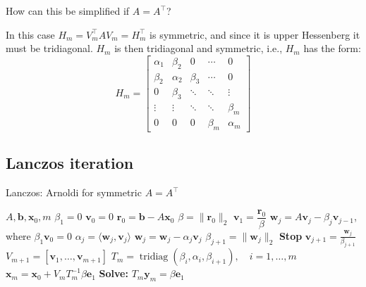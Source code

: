 How can this be simplified if $A = A^\top$?

In this case $H_m = V_m^\top A V_m = H_m^\top$ is symmetric, and since it is upper Hessenberg it must be tridiagonal.
$H_m$ is then tridiagonal and symmetric, i.e., $H_m$ has the form:
\[
    H_m =
    \begin{bmatrix}
        \alpha_1 & \beta_2  & 0       & \cdots  & 0        \\
        \beta_2  & \alpha_2 & \beta_3 & \cdots  & 0        \\
        0        & \beta_3  & \ddots  & \ddots  & \vdots   \\
        \vdots   & \vdots   & \ddots  & \ddots  & \beta_m  \\
        0        & 0        & 0       & \beta_m & \alpha_m
    \end{bmatrix}
\]

\subsection{Lanczos iteration}
\begin{algorithm}[H]
    \caption{Lanczos: Arnoldi for symmetric $A=A^\top$}
    \begin{algorithmic}[0]
        \Require $A, \mathbf{b}, \mathbf{x}_0, m$
        \State $\beta_1 = 0$
        \State $\mathbf{v}_0 = 0$
        \State $\mathbf{r}_0 = \mathbf{b} - A\mathbf{x}_0$
        \State $\beta = \|\mathbf{r}_0\|_2$
        \State $\mathbf{v}_1 = \dfrac{\mathbf{r}_0}{\beta}$
        \State $\mathbf{w}_j = A\mathbf{v}_j - \beta_j \mathbf{v}_{j-1}$, where $\beta_1 \mathbf{v}_0 = 0$
        \State $\alpha_j = \langle \mathbf{w}_j, \mathbf{v}_j \rangle$
        \State $\mathbf{w}_j = \mathbf{w}_j - \alpha_j \mathbf{v}_j$
        \State $\beta_{j+1} = \|\mathbf{w}_j\|_2$
         \textbf{Stop}
        \EndIf
        \State $\mathbf{v}_{j+1} = \frac{\mathbf{w}_j}{\beta_{j+1}}$
        \EndFor
        \Return $V_{m+1} = [\mathbf{v}_1, \ldots, \mathbf{v}_{m+1}]$
        \State $T_m = \operatorname{tridiag}(\beta_i, \alpha_i, \beta_{i+1}), \quad i=1,\ldots,m$
        \State $\mathbf{x}_m = \mathbf{x}_0 + V_m T_m^{-1} \beta \mathbf{e}_1$
        \State \textbf{Solve:} $T_m \mathbf{y}_m = \beta \mathbf{e}_1$
    \end{algorithmic}
\end{algorithm}

